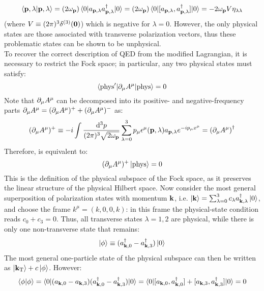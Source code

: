 \begin{equation}
  \braket{\mathbf{p} , \lambda | \mathbf{p} , \lambda} = (2\omega_{\mathbf{p}}) \braket{0 | a_{\mathbf{p},\lambda} a_{\mathbf{p},\lambda}^\dagger | 0} = (2\omega_{\mathbf{p}}) \braket{0 | [a_{\mathbf{p},\lambda} , a_{\mathbf{p},\lambda}^\dagger] | 0} = - 2\omega_{\mathbf{p}} V \eta_{\lambda \lambda}
\end{equation}
(where $ V \equiv (2\pi)^3 \delta^{(3)}(\mathbf{0}) $) which is negative for $ \lambda = 0 $. However, the only physical states are those associated with transverse polarization vectors, thus these problematic states can be shown to be unphysical. \\
To recover the correct description of QED from the modified Lagrangian, it is necessary to restrict the Fock space; in particular, any two physical states must satisfy:
\begin{equation}
  \braket{\text{phys}' | \partial_\mu A^\mu | \text{phys}} = 0
  \label{eq:qed-phys-cond-1}
\end{equation}
Note that $ \partial_\mu A^\mu $ can be decomposed into its positive- and negative-frequency parts $ \partial_\mu A^\mu = (\partial_\mu A^\mu)^+ + (\partial_\mu A^\mu)^- $ as:
\begin{equation*}
  (\partial_\mu A^\mu)^+ \equiv -i \int \frac{\mathrm{d}^3p}{(2\pi)^3 \sqrt{2\omega_{\mathbf{p}}}} \sum_{\lambda = 0}^{3} p_\mu \epsilon^\mu(\mathbf{p},\lambda) a_{\mathbf{p},\lambda} e^{-i p_\mu x^\mu} = {(\partial_\mu A^\mu)}^\dagger
\end{equation*}
Therefore,  is equivalent to:
\begin{equation}
  (\partial_\mu A^\mu)^+ \ket{\text{phys}} = 0
\end{equation}
This is the definition of the physical subspace of the Fock space, as it preserves the linear structure of the physical Hilbert space. Now consider the most general superposition of polarization states with momentum $ \mathbf{k} $, i.e. $ \ket{\mathbf{k}} = \sum_{\lambda = 0}^{3} c_\lambda a_{\mathbf{k},\lambda}^\dagger \ket{0} $, and choose the frame $ k^\mu = (k,0,0,k) $: in this frame the physical-state condition reads $ c_0 + c_3 = 0 $. Thus, all transverse states $ \lambda = 1,2 $ are physical, while there is only one non-transverse state that remains:
\begin{equation*}
  \ket{\phi} \equiv (a_{\mathbf{k},0}^\dagger - a_{\mathbf{k},3}^\dagger) \ket{0}
\end{equation*}
The most general one-particle state of the physical subspace can then be written as $ \ket{\mathbf{k}_\text{T}} + c \ket{\phi} $. However:
\begin{equation*}
  \braket{\phi | \phi} = \braket{0 | (a_{\mathbf{k},0} - a_{\mathbf{k},3}) (a_{\mathbf{k},0}^\dagger - a_{\mathbf{k},3}^\dagger) | 0} = \braket{0 | [a_{\mathbf{k},0} , a_{\mathbf{k},0}^\dagger] + [a_{\mathbf{k},3} , a_{\mathbf{k},3}^\dagger] | 0} = 0
\end{equation*}
